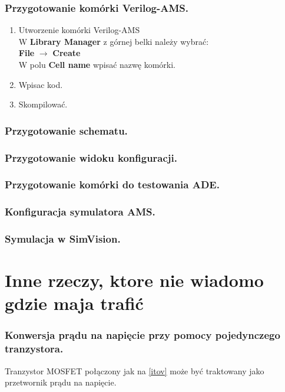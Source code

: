 \documentclass[10pt,a4paper]{report}
\theoremstyle{definition}
\theoremstyle{definition}
\theoremstyle{definition}
\theoremstyle{definition}
\theoremstyle{definition}
\begin{document}
{	\subsection{Przygotowanie komórki Verilog-AMS.}
	\begin{enumerate}
		\item Utworzenie komórki Verilog-AMS \\
			W \textbf{Library Manager} z górnej belki należy wybrać: \\ 
			\textbf{File} $\rightarrow$ \textbf{Create} \\
			W polu \textbf{Cell name} wpisać nazwę komórki.
		\item Wpisac kod.
		\item Skompilować.
	\end{enumerate}
	\subsection{Przygotowanie schematu.}
	
	\subsection{Przygotowanie widoku konfiguracji.}
	\subsection{Przygotowanie komórki do testowania ADE.}
	
	
	\subsection{Konfiguracja symulatora AMS.}
	
	\subsection{Symulacja w SimVision.}
	
	
	\chapter{Inne rzeczy, ktore nie wiadomo gdzie maja trafić}
		\subsection{Konwersja prądu na napięcie przy pomocy pojedynczego tranzystora.}
	{	Tranzystor MOSFET połączony jak na \ref{itov} może być traktowany jako przetwornik prądu na napięcie. 
	}
	
}
\end{document}
